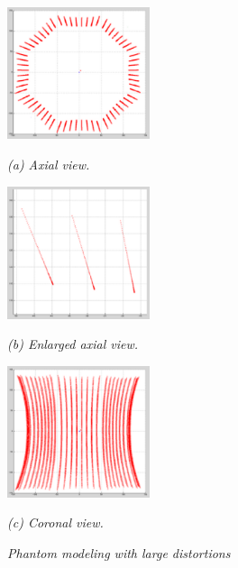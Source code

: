 \begin{figure}[htb]

  \begin{minipage}[b]{1.65in}
    \centering
    \centerline{\mbox{\includegraphics[width=1.65in]{isocenter/images/simulation/axial_distortion_0.eps}}}
    \centerline{\emph{(a) Axial view.}}\medskip
  \end{minipage}
  \hfill
  \begin{minipage}[b]{1.65in}
    \centering
    \centerline{\mbox{\includegraphics[width=1.65in]{isocenter/images/simulation/axial_tube_distortion_0.eps}}}
    \centerline{\emph{(b) Enlarged axial view.}}\medskip
  \end{minipage}
  \hfill
  \begin{minipage}[b]{1.65in}
    \centering
    \centerline{\mbox{\includegraphics[width=1.65in]{isocenter/images/simulation/coronal_distortion_0.eps}}}
    \centerline{\emph{(c) Coronal view.}}\medskip
  \end{minipage}
%
\caption{\emph{Phantom modeling with large distortions}} \label{fig:2}
%
\end{figure}

